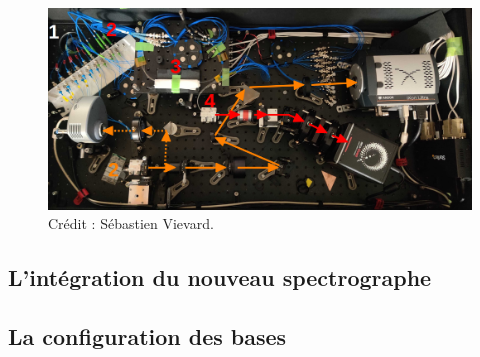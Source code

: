 \begin{figure}[ht!]
    \centering
    \includegraphics[width=\figwidth]{Figure_Chap5/20220601_SCExAO_FIRSTRecombBench_V1_V2_Photo_label.png}
    \caption[]{Crédit : Sébastien Vievard.}
    \label{fig:FIRSTSubaruPhoto}
\end{figure}


\subsection{L'intégration du nouveau spectrographe}


\subsection{La configuration des bases}


